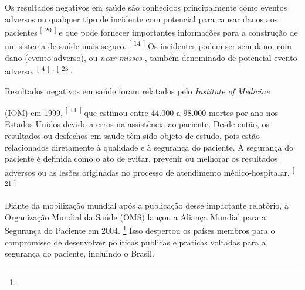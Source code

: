 \documentclass{article}
\begin{document}

Os resultados negativos em saúde são conhecidos principalmente como eventos adversos ou
        qualquer tipo de incidente com potencial para causar danos aos pacientes %
\textsuperscript{[}%
\textsuperscript{20}
\textsuperscript{]}  
 e que pode fornecer importantes informações para a construção de um sistema de saúde
        mais seguro. %
\textsuperscript{[}%
\textsuperscript{14}
\textsuperscript{]}  
 Os incidentes podem ser sem dano, com dano (evento adverso), ou %
\textit{near
          misses}
 , também denominado de potencial evento adverso. %
\textsuperscript{[}%
\textsuperscript{4}
\textsuperscript{]}  
\textsuperscript{,}
\textsuperscript{[}%
\textsuperscript{23}
\textsuperscript{]}  


Resultados negativos em saúde foram relatados pelo %
\textit{Institute of Medicine}

        (IOM) em 1999, %
\textsuperscript{[}%
\textsuperscript{11}
\textsuperscript{]}  
 que estimou entre 44.000 a 98.000 mortes por ano nos Estados Unidos devido a erros
        na assistência ao paciente. Desde então, os resultados ou desfechos em saúde têm sido objeto
        de estudo, pois estão relacionados diretamente à qualidade e à segurança do paciente. A
        segurança do paciente é definida como o ato de evitar, prevenir ou melhorar os resultados
        adversos ou as lesões originadas no processo de atendimento médico-hospitalar. %
\textsuperscript{[}%
\textsuperscript{21}
\textsuperscript{]}  


Diante da mobilização mundial após a publicação desse impactante relatório, a Organização
        Mundial da Saúde (OMS) lançou a Aliança Mundial para a Segurança do Paciente em 2004. %
\footnote{}  
 Isso despertou os países membros para o compromisso de desenvolver políticas
        públicas e práticas voltadas para a segurança do paciente, incluindo o Brasil.
\end{document}
